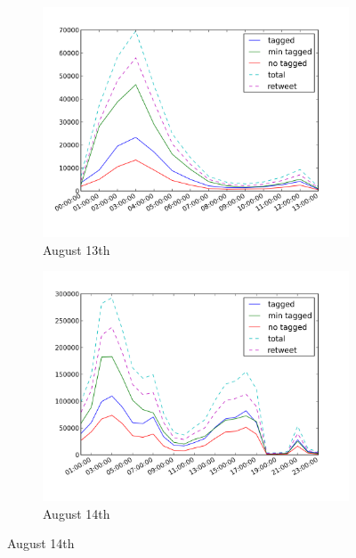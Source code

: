 \documentclass[a4paper,twoside,12pt,openright]{report}
\begin{document}
\begin{figure}[H]
\begin{subfigure}[t]{0.48\textwidth}
\begin{center}
	\includegraphics[width=\textwidth]{images/freqs/freq_12_08.png}
	\caption{August 13th}
\end{center}
\end{subfigure}
\hfill
\begin{subfigure}[t]{0.48\textwidth}
\begin{center}
	\includegraphics[width=\textwidth]{images/freqs/freq_14_08.png}
	\caption{August 14th}
\end{center}
\end{subfigure}


\end{figure}
\end{document}
